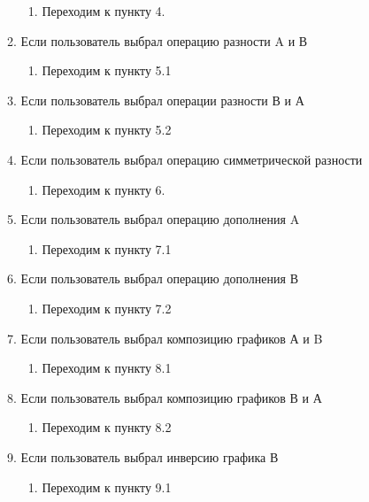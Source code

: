 \documentclass[a4paper,12pt]{extarticle}
\begin{document}
\begin{enumerate}
\begin{enumerate}[label*=\arabic*.]
\begin{enumerate}[label*=\arabic*.]
      \item Переходим к пункту 4.
    \end{enumerate}
    \item Если пользователь выбрал операцию разности A и В
    \begin{enumerate}[label*=\arabic*.]
      \item Переходим к пункту 5.1
    \end{enumerate}
    \item Если пользователь выбрал операции разности В и А
    \begin{enumerate}[label*=\arabic*.]
      \item Переходим к пункту 5.2
    \end{enumerate}
    \item Если пользователь выбрал операцию симметрической разности
    \begin{enumerate}[label*=\arabic*.]
      \item Переходим к пункту 6.
    \end{enumerate}
    \item Если пользователь выбрал операцию дополнения A
    \begin{enumerate}[label*=\arabic*.]
      \item Переходим к пункту 7.1
    \end{enumerate}
    \item Если пользователь выбрал операцию дополнения В
    \begin{enumerate}[label*=\arabic*.]
      \item Переходим к пункту 7.2
    \end{enumerate}
    \item Если пользователь выбрал композицию графиков А и B 
    \begin{enumerate}[label*=\arabic*.]
      \item Переходим к пункту 8.1
    \end{enumerate}
    \item Если пользователь выбрал композицию графиков В и А
    \begin{enumerate}[label*=\arabic*.]
      \item Переходим к пункту 8.2
    \end{enumerate}
        \item Если пользователь выбрал инверсию графика В
    \begin{enumerate}[label*=\arabic*.]
      \item Переходим к пункту 9.1
    \end{enumerate}

\end{enumerate}
\end{enumerate}
\end{document}
